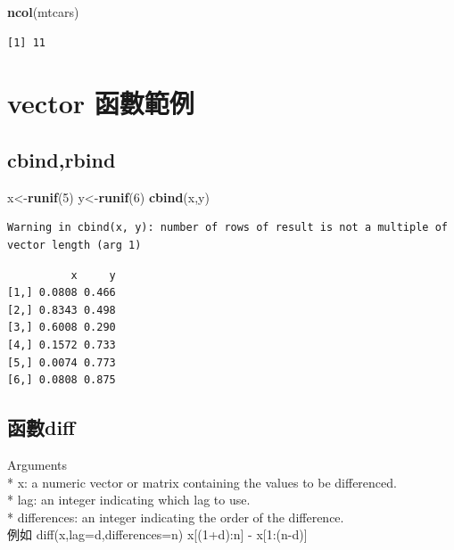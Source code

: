 \documentclass[]{book}
\newenvironment{Shaded}{\begin{snugshade}}{\end{snugshade}}
\newcommand{\DecValTok}[1]{\textcolor[rgb]{0.00,0.00,0.81}{#1}}
\newcommand{\KeywordTok}[1]{\textcolor[rgb]{0.13,0.29,0.53}{\textbf{#1}}}
\newcommand{\NormalTok}[1]{#1}
\theoremstyle{definition}
\theoremstyle{definition}
\theoremstyle{definition}
\theoremstyle{remark}
\begin{document}
\begin{Shaded}
\begin{Highlighting}[]
\KeywordTok{ncol}\NormalTok{(mtcars)}
\end{Highlighting}
\end{Shaded}

\begin{verbatim}
[1] 11
\end{verbatim}

\hypertarget{vector-}{%
\section{vector 函數範例}\label{vector-}}

\hypertarget{cbindrbind}{%
\subsection{cbind,rbind}\label{cbindrbind}}

\begin{Shaded}
\begin{Highlighting}[]
\NormalTok{x<-}\KeywordTok{runif}\NormalTok{(}\DecValTok{5}\NormalTok{)}
\NormalTok{y<-}\KeywordTok{runif}\NormalTok{(}\DecValTok{6}\NormalTok{)}
\KeywordTok{cbind}\NormalTok{(x,y)}
\end{Highlighting}
\end{Shaded}

\begin{verbatim}
Warning in cbind(x, y): number of rows of result is not a multiple of
vector length (arg 1)
\end{verbatim}

\begin{verbatim}
          x     y
[1,] 0.0808 0.466
[2,] 0.8343 0.498
[3,] 0.6008 0.290
[4,] 0.1572 0.733
[5,] 0.0074 0.773
[6,] 0.0808 0.875
\end{verbatim}

\hypertarget{diff}{%
\subsection{函數diff}\label{diff}}

Arguments\\
* x: a numeric vector or matrix containing the values to be
differenced.\\
* lag: an integer indicating which lag to use.\\
* differences: an integer indicating the order of the difference.\\
例如 diff(x,lag=d,differences=n) x{[}(1+d):n{]} - x{[}1:(n-d){]}
\end{document}
